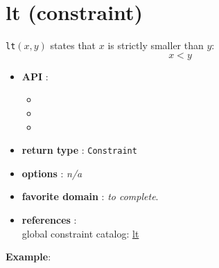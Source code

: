 \label{lt}
\hypertarget{lt}{}

\section{lt (constraint)}\label{lt:ltconstraint}\hypertarget{lt:ltconstraint}{}
\begin{notedef}
  \texttt{lt}$(x,y)$ states that $x$ is strictly smaller than $y$:
$$x<y$$
\end{notedef}

\begin{itemize}
	\item \textbf{API} :
	\begin{itemize}
		\item {}
		\item {}
		\item {}
	\end{itemize}
	\item \textbf{return type} : \texttt{Constraint}
	\item \textbf{options} : \emph{n/a}
	\item \textbf{favorite domain} : \emph{to complete}.
	\item \textbf{references} :\\
      global constraint catalog: \href{http://www.emn.fr/x-info/sdemasse/gccat/Clt.html}{lt}
\end{itemize}

\textbf{Example}:

